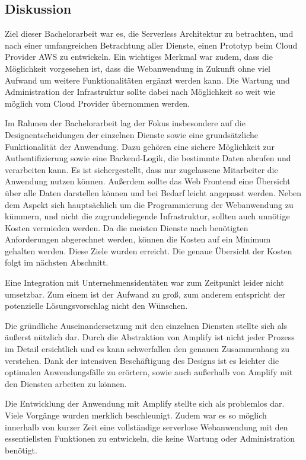 \subsection{Diskussion}

Ziel dieser Bachelorarbeit war es, die Serverless Architektur zu betrachten, und nach einer umfangreichen Betrachtung aller Dienste, einen Prototyp beim Cloud Provider AWS zu entwickeln.
Ein wichtiges Merkmal war zudem, dass die Möglichkeit vorgesehen ist, dass die Webanwendung in Zukunft ohne viel Aufwand um weitere Funktionalitäten ergänzt werden kann.
Die Wartung und Administration der Infrastruktur sollte dabei nach Möglichkeit so weit wie möglich vom Cloud Provider übernommen werden.

Im Rahmen der Bachelorarbeit lag der Fokus insbesondere auf die Designentscheidungen der einzelnen Dienste sowie eine grundsätzliche Funktionalität der Anwendung.
Dazu gehören eine sichere Möglichkeit zur Authentifizierung sowie eine Backend-Logik, die bestimmte Daten abrufen und verarbeiten kann.
Es ist sichergestellt, dass nur zugelassene Mitarbeiter die Anwendung nutzen können.
Außerdem sollte das Web Frontend eine Übersicht über alle Daten darstellen können und bei Bedarf leicht angepasst werden.
Neben dem Aspekt sich hauptsächlich um die Programmierung der Webanwendung zu kümmern, und nicht die zugrundeliegende Infrastruktur, sollten auch unnötige Kosten vermieden werden.
Da die meisten Dienste nach benötigten Anforderungen abgerechnet werden, können die Kosten auf ein Minimum gehalten werden.
Diese Ziele wurden erreicht. Die genaue Übersicht der Kosten folgt im nächsten Abschnitt.

Eine Integration mit Unternehmensidentäten war zum Zeitpunkt leider nicht umsetzbar.
Zum einem ist der Aufwand zu groß, zum anderem entspricht der potenzielle Lösungsvorschlag nicht den Wünschen.

Die gründliche Auseinandersetzung mit den einzelnen Diensten stellte sich als äußerst nützlich dar.
Durch die Abstraktion von Amplify ist nicht jeder Prozess im Detail ersichtlich und es kann schwerfallen den genauen Zusammenhang zu verstehen.
Dank der intensiven Beschäftigung des Designs ist es leichter die optimalen Anwendungsfälle zu erörtern, sowie auch außerhalb von Amplify mit den Diensten arbeiten zu können.

Die Entwicklung der Anwendung mit Amplify stellte sich als problemlos dar.
Viele Vorgänge wurden merklich beschleunigt.
Zudem war es so möglich innerhalb von kurzer Zeit eine vollständige serverlose Webanwendung mit den essentiellsten Funktionen zu entwickeln, die keine Wartung oder Administration benötigt.
\clearpage

